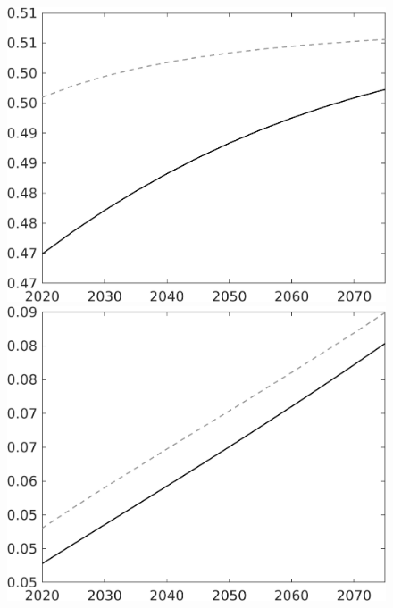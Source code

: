 \documentclass[12pt]{article}
\begin{document}
\begin{figure}
\begin{minipage}[]{0.32\textwidth}
\end{minipage}
\begin{minipage}[]{0.32\textwidth}
	\includegraphics[width=1\textwidth]{../../codding_model/own_basedOnFried/optimalPol_010922_revision/figures/all_13Sept22/LevTaufNoTauf_TaulCalib_Equlab_regime0_sn_spillover0_nsk1_xgr0_knspil1_sep1_LFlimit0_emsbase0_countec0_GovRev0_etaa0.79_lgd0.png}
\end{minipage}
\begin{minipage}[]{0.32\textwidth}
	\includegraphics[width=1\textwidth]{../../codding_model/own_basedOnFried/optimalPol_010922_revision/figures/all_13Sept22/LevTaufNoTauf_TaulCalib_Equlab_regime0_wsn_spillover0_nsk1_xgr0_knspil1_sep1_LFlimit0_emsbase0_countec0_GovRev0_etaa0.79_lgd0.png}

\end{minipage}
\end{figure}
\end{document}
